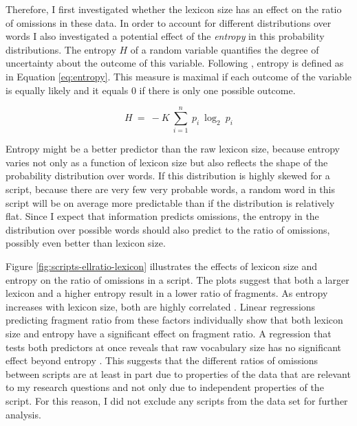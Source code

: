 \noindent Therefore, I first investigated whether the lexicon size has an effect on the ratio of omissions in these data. In order to account for different distributions over words I also investigated a potential effect of the \textit{entropy} in this probability distributions. The entropy $H$ of a random variable quantifies the degree of uncertainty about the outcome of this variable. Following \citet[393]{shannon1948}, entropy is defined as in Equation \ref{eq:entropy}. This measure is maximal if each outcome of the variable is equally likely and it equals 0 if there is only one possible outcome.

\begin{equation}
 H\ =\ - K\ \sum_{i=1}^n\ p_i\ \log_2 \ p_i \label{eq:entropy}
\end{equation}

Entropy might be a better predictor than the raw lexicon size, because entropy varies not only as a function of lexicon size but also reflects the shape of the probability distribution over words. If this distribution is highly skewed for a script, because there are very few very probable words, a random word in this script will be on average more predictable than if the distribution is relatively flat. Since I expect that information predicts omissions, the entropy in the distribution over possible words should also predict to the ratio of omissions, possibly even better than lexicon size.

\newpage
\noindent Figure \ref{fig:scripts-ellratio-lexicon} illustrates the effects of lexicon size and entropy on the ratio of omissions in a script. The plots suggest that both a larger lexicon and a higher entropy result in a lower ratio of fragments. As entropy increases with lexicon size, both are highly correlated . Linear regressions predicting fragment ratio from these factors individually show that both lexicon size  and entropy  have a significant effect on fragment ratio. A regression that tests both predictors at once reveals that raw vocabulary size has no significant effect beyond entropy . This suggests that the different ratios of omissions between scripts are at least in part due to properties of the data that are relevant to my research questions and not only due to independent properties of the script. For this reason, I did not exclude any scripts from the data set for further analysis.


